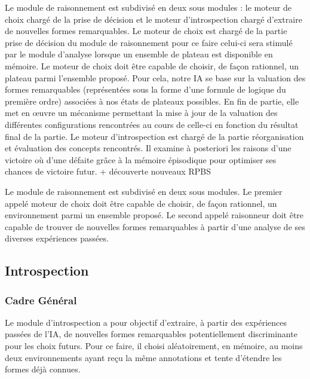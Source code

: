 
Le module de raisonnement est subdivisé en deux sous modules : le \og moteur de choix \fg{} chargé de la prise de décision et le \og moteur d'introspection \fg{} chargé d'extraire de nouvelles formes remarquables.
Le moteur de choix est chargé de la partie  prise de décision du module  de raisonnement pour ce faire celui-ci sera \og stimulé \fg{} par le module d'analyse lorsque un ensemble de plateau est disponible en mémoire. Le moteur de choix doit être capable de choisir, de façon rationnel, un plateau parmi l'ensemble proposé. Pour cela, notre IA se base sur la valuation des formes remarquables (représentées sous la forme d'une formule de logique du première ordre) associées à  nos  états de plateaux possibles. En fin de partie, elle met en œuvre un mécanisme permettant la mise à jour de la valuation des différentes \og configurations \fg{} rencontrées au cours de celle-ci en fonction du résultat final de la partie.
Le moteur d'introspection est chargé de la  partie réorganisation et évaluation des \og concepts \fg{} rencontrés. Il  examine à posteriori les raisons d'une victoire où d'une défaite grâce à  la mémoire épisodique pour optimiser ses chances de victoire futur. {+ découverte nouveaux RPBS}

Le module de raisonnement est subdivisé en deux sous modules. Le premier appelé \og moteur de choix \fg{} doit être capable de choisir, de façon rationnel, un environnement parmi un ensemble proposé. Le second appelé \og raisonneur \fg{} doit être capable de trouver de nouvelles formes remarquables à partir d'une analyse de ses diverses expériences passées.

\subsection{Introspection}

\subsubsection{Cadre Général}

Le module d'introspection a pour objectif d'extraire, à partir des expériences passées de l'IA, de nouvelles formes remarquables potentiellement discriminante pour les choix futurs. Pour ce faire, il choisi aléatoirement, en mémoire, au moins deux environnements ayant reçu la même annotations et tente d'étendre les formes déjà connues.

